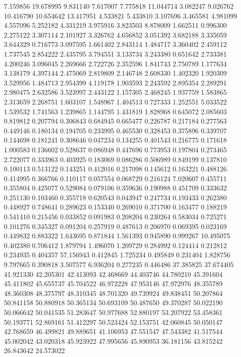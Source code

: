7.159856
19.678995
9.831140
7.617007
7.775818
11.044714
3.082247
9.026762
10.416790
10.654642
13.417951
4.533821
5.433810
3.107696
3.465581
4.981099
4.557096
5.252182
4.331219
3.975916
3.823503
8.878009
1.662511
0.996300
2.275122
3.307114
2.101927
3.326762
4.656852
3.051392
3.682188
3.335059
3.644329
0.716773
3.097595
1.661402
2.843114
1.484717
3.360402
2.459112
1.737545
2.854222
2.435795
3.794551
3.133734
3.243380
0.651642
2.733381
4.200246
3.096045
2.269666
2.722726
2.352596
1.841743
2.750789
1.177634
3.138179
4.397144
2.475069
2.819809
2.146748
2.608330
1.402320
1.920309
3.529956
1.484713
2.954399
4.119178
1.903593
2.243592
2.895354
2.289291
2.980475
2.632586
3.523997
2.443122
1.157305
2.468245
1.937759
1.583865
2.313659
2.268751
1.603107
1.548967
1.404513
0.727333
1.252551
5.033522
1.539532
1.741563
1.239865
1.144795
1.431819
1.828968
0.645072
2.085603
0.819812
0.207794
0.306843
0.684945
0.665477
0.226787
0.217184
0.277563
0.449146
0.180134
0.194705
0.233995
0.465530
0.328453
0.375896
0.339707
0.144698
0.181241
0.308646
0.047234
0.134255
0.401543
0.216775
0.171618
1.000583
0.136602
0.528637
0.086948
0.447696
0.773953
0.197804
0.273465
2.722077
0.333963
0.403925
0.183069
0.086286
0.506989
0.849199
0.137810
0.100113
0.513122
0.143251
0.412016
0.217098
0.145612
0.163221
0.488126
0.414995
0.366766
0.110117
0.057554
0.068729
0.216124
7.020607
0.455711
0.355804
0.425077
0.529084
0.079106
0.359636
0.190988
0.451709
0.333632
0.251130
0.103460
0.355718
0.620543
0.043947
0.247734
0.193433
0.262380
0.448927
0.748641
0.289623
0.153340
0.269010
0.371700
0.163477
0.188219
0.541410
0.215456
0.033852
0.091983
0.208204
0.230264
0.583034
0.725271
0.101276
0.345327
0.091204
0.257919
0.487613
0.206970
0.069395
0.023169
0.449832
0.883322
1.643695
0.871844
1.561393
0.945890
0.999267
10.495075
0.402380
0.706412
1.879794
1.496070
1.209729
0.284992
0.124414
0.212812
0.234935
0.404357
57.156943
0.412845
1.725234
0.495849
0.231404
1.828756
9.797665
0.390818
3.507577
6.936204
0.277235
0.446486
37.385825
37.674405
41.921330
42.205301
42.413093
42.468669
44.403746
44.780210
45.391604
45.411802
45.655737
45.704522
46.972228
47.953146
47.972976
48.355789
48.360308
48.375797
48.310345
48.701320
49.739924
49.838451
50.207864
50.841158
50.880918
50.365134
50.693109
50.487650
49.370287
50.022190
50.066642
50.041535
51.283647
50.977688
52.880197
53.207922
53.458361
50.193771
52.869161
51.412297
50.523424
52.153751
42.060845
50.050147
42.768659
46.499821
49.889651
41.106953
47.551547
47.543382
41.517544
45.002042
43.020318
45.923922
47.995656
45.890953
36.181156
43.815242
26.843642
24.573022
